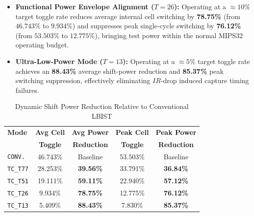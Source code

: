 \documentclass[conference]{IEEEtran}
\begin{document}
\FloatBarrier


\begin{itemize}
    \item \textbf{Functional Power Envelope Alignment ($T = 26$):} Operating at a $\approx 10\%$ target toggle rate reduces average internal cell switching by \textbf{78.75\%} (from $46.743\%$ to $9.934\%$) and suppresses peak single-cycle switching by \textbf{76.12\%} (from $53.503\%$ to $12.775\%$), bringing test power within the normal MIPS32 operating budget.
    \item \textbf{Ultra-Low-Power Mode ($T = 13$):} Operating at a $\approx 5\%$ target toggle rate achieves an \textbf{88.43\%} average shift-power reduction and \textbf{85.37\%} peak switching suppression, effectively eliminating $IR$-drop induced capture timing failures.
\end{itemize}



\begin{table}[H]
    \centering
    \caption{Dynamic Shift Power Reduction Relative to Conventional LBIST}
    \label{tab:power_red}
    \begin{tabular}{@{}lcccc@{}}
        \toprule
        \textbf{Mode} & \textbf{Avg Cell} & \textbf{Avg Power} & \textbf{Peak Cell} & \textbf{Peak Power} \\
                      & \textbf{Toggle}   & \textbf{Reduction} & \textbf{Toggle}    & \textbf{Reduction} \\
        \midrule
        \texttt{CONV.}      & 46.743\% & Baseline & 53.503\% & Baseline \\
        \texttt{TC\_T77}    & 28.253\% & \textbf{39.56\%} & 33.791\% & \textbf{36.84\%} \\
        \texttt{TC\_T51}    & 19.111\% & \textbf{59.11\%} & 22.940\% & \textbf{57.12\%} \\
        \texttt{TC\_T26}    & 9.934\%  & \textbf{78.75\%} & 12.775\% & \textbf{76.12\%} \\
        \texttt{TC\_T13}    & 5.409\%  & \textbf{88.43\%} & 7.830\%  & \textbf{85.37\%} \\
        \bottomrule
    \end{tabular}
\end{table}
\end{document}
